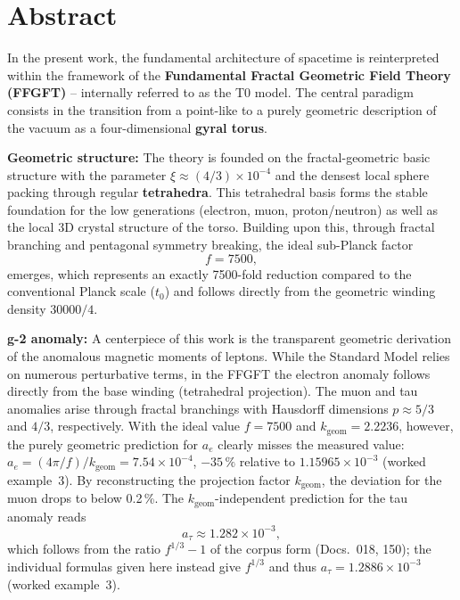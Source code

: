 \section*{Abstract}
		In the present work, the fundamental architecture of spacetime is reinterpreted within the framework of the \textbf{Fundamental Fractal Geometric Field Theory (FFGFT)} -- internally referred to as the T0 model. The central paradigm consists in the transition from a point-like to a purely geometric description of the vacuum as a four-dimensional \textbf{gyral torus}.
		
		\textbf{Geometric structure:} The theory is founded on the fractal-geometric basic structure with the parameter $\xi \approx (4/3)\times 10^{-4}$ and the densest local sphere packing through regular \textbf{tetrahedra}. This tetrahedral basis forms the stable foundation for the low generations (electron, muon, proton/neutron) as well as the local 3D crystal structure of the torso. Building upon this, through fractal branching and pentagonal symmetry breaking, the ideal sub-Planck factor
		\begin{equation*}
			f = 7500,
		\end{equation*}
		emerges, which represents an exactly 7500-fold reduction compared to the conventional Planck scale ($t_0$) and follows directly from the geometric winding density $30000/4$.
		
		\textbf{g-2 anomaly:} A centerpiece of this work is the transparent geometric derivation of the anomalous magnetic moments of leptons. While the Standard Model relies on numerous perturbative terms, in the FFGFT the electron anomaly follows directly from the base winding (tetrahedral projection). The muon and tau anomalies arise through fractal branchings with Hausdorff dimensions $p \approx 5/3$ and $4/3$, respectively. With the ideal value $f = 7500$ and $k_\text{geom} = 2.2236$, however, the purely geometric prediction for $a_e$ clearly misses the measured value: $a_e = (4\pi/f)/k_\text{geom} = 7.54\times10^{-4}$, $-35\,\%$ relative to $1.15965\times10^{-3}$ (worked example~3). By reconstructing the projection factor $k_\text{geom}$, the deviation for the muon drops to below 0.2\,\%. The $k_\text{geom}$-independent prediction for the tau anomaly reads
		\begin{equation*}
			a_\tau \approx 1.282 \times 10^{-3},
		\end{equation*}
		which follows from the ratio $f^{1/3} - 1$ of the corpus form (Docs.~018, 150); the individual formulas given here instead give $f^{1/3}$ and thus $a_\tau = 1.2886\times10^{-3}$ (worked example~3).
		
